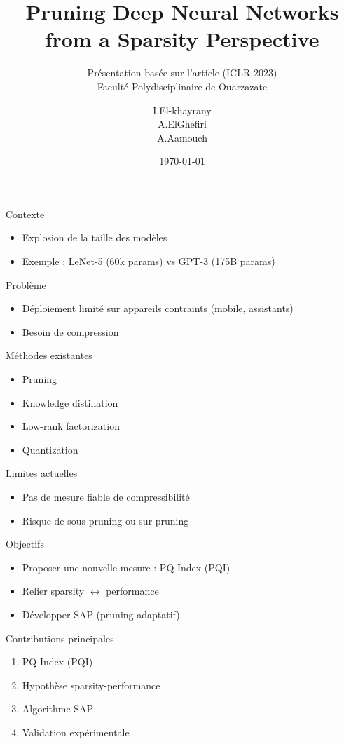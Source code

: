 \documentclass{beamer}
\title{Pruning Deep Neural Networks from a Sparsity Perspective}
\subtitle{Présentation basée sur l’article (ICLR 2023)\\ Faculté Polydisciplinaire de Ouarzazate}
\author{I.El-khayrany \\ A.ElGhefiri \\ A.Aamouch }
\date{\today}
\begin{document}
\frame{\titlepage}

\begin{frame}{Contexte}
\begin{itemize}
\item Explosion de la taille des modèles
\item Exemple : LeNet-5 (60k params) vs GPT-3 (175B params)
\end{itemize}
\end{frame}

\begin{frame}{Problème}
\begin{itemize}
\item Déploiement limité sur appareils contraints (mobile, assistants)
\item Besoin de compression
\end{itemize}
\end{frame}

\begin{frame}{Méthodes existantes}
\begin{itemize}
\item Pruning
\item Knowledge distillation
\item Low-rank factorization
\item Quantization
\end{itemize}
\end{frame}

\begin{frame}{Limites actuelles}
\begin{itemize}
\item Pas de mesure fiable de compressibilité
\item Risque de sous-pruning ou sur-pruning
\end{itemize}
\end{frame}

\begin{frame}{Objectifs}
\begin{itemize}
\item Proposer une nouvelle mesure : PQ Index (PQI)
\item Relier sparsity $\leftrightarrow$ performance
\item Développer SAP (pruning adaptatif)
\end{itemize}
\end{frame}

\begin{frame}{Contributions principales}
\begin{enumerate}
\item PQ Index (PQI)
\item Hypothèse sparsity-performance
\item Algorithme SAP
\item Validation expérimentale
\end{enumerate}
\end{frame}
\end{document}
